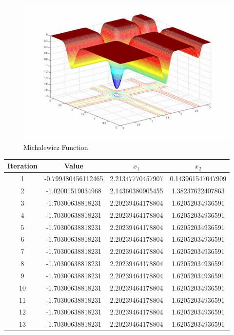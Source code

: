 \documentclass[oneside,12pt,openany]{book}
\begin{document}
    \begin{figure}[hbt!]
        \centering
        \includegraphics[width=.55\linewidth]{images/Michalewics.jpg}
        \caption{Michalewicz Function}
        \label{fig:Michalewics}
    \end{figure}

   \FloatBarrier
   \begin{longtable}[c]{|c|c|c|c|}
        \hline
        \textbf{Iteration} & \textbf{Value} & \textbf{$x_{1}$} & \textbf{$x_{2}$} \\ \hline
        \endhead
        1 & -0.799480456112465 & 2.21347770457907 & 0.143961547047909 \\ \hline
        2 & -1.02001519034968 & 2.14360380905455 & 1.38237622407863 \\ \hline
        3 & -1.70300638818231 & 2.20239464178804 & 1.62052034936591 \\ \hline
        4 & -1.70300638818231 & 2.20239464178804 & 1.62052034936591 \\ \hline
        5 & -1.70300638818231 & 2.20239464178804 & 1.62052034936591 \\ \hline
        6 & -1.70300638818231 & 2.20239464178804 & 1.62052034936591 \\ \hline
        7 & -1.70300638818231 & 2.20239464178804 & 1.62052034936591 \\ \hline
        8 & -1.70300638818231 & 2.20239464178804 & 1.62052034936591 \\ \hline
        9 & -1.70300638818231 & 2.20239464178804 & 1.62052034936591 \\ \hline
        10 & -1.70300638818231 & 2.20239464178804 & 1.62052034936591 \\ \hline
        11 & -1.70300638818231 & 2.20239464178804 & 1.62052034936591 \\ \hline
        12 & -1.70300638818231 & 2.20239464178804 & 1.62052034936591 \\ \hline
        13 & -1.70300638818231 & 2.20239464178804 & 1.62052034936591 \\ \hline

\end{longtable}
\end{document}
